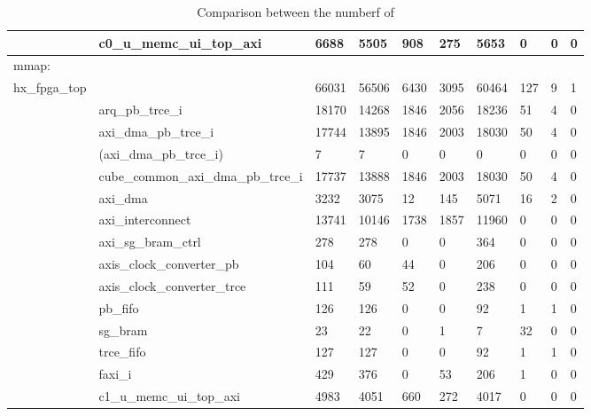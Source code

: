 \begin{table}
\begin{center}
\begin{tabular}{llllllllll}
&    c0\_u\_memc\_ui\_top\_axi                            &       6688 &       5505 &     908 &  275 &  5653 &      0 &      0 &          0 \\
\midrule
mmap: \\
  hx\_fpga\_top                                        & &      66031 &      56506 &    6430 & 3095 & 60464 &    127 &      9 &          1 \\
&   arq\_pb\_trce\_i                                      &      18170 &      14268 &    1846 & 2056 & 18236 &     51 &      4 &          0 \\
&     axi\_dma\_pb\_trce\_i                                &      17744 &      13895 &    1846 & 2003 & 18030 &     50 &      4 &          0 \\
&       (axi\_dma\_pb\_trce\_i)                            &          7 &          7 &       0 &    0 &     0 &      0 &      0 &          0 \\
&       cube\_common\_axi\_dma\_pb\_trce\_i                  &      17737 &      13888 &    1846 & 2003 & 18030 &     50 &      4 &          0 \\
&         axi\_dma                                      &       3232 &       3075 &      12 &  145 &  5071 &     16 &      2 &          0 \\
&         axi\_interconnect                             &      13741 &      10146 &    1738 & 1857 & 11960 &      0 &      0 &          0 \\
&         axi\_sg\_bram\_ctrl                             &        278 &        278 &       0 &    0 &   364 &      0 &      0 &          0 \\
&         axis\_clock\_converter\_pb                      &        104 &         60 &      44 &    0 &   206 &      0 &      0 &          0 \\
&         axis\_clock\_converter\_trce                    &        111 &         59 &      52 &    0 &   238 &      0 &      0 &          0 \\
&         pb\_fifo                                      &        126 &        126 &       0 &    0 &    92 &      1 &      1 &          0 \\
&         sg\_bram                                      &         23 &         22 &       0 &    1 &     7 &     32 &      0 &          0 \\
&         trce\_fifo                                    &        127 &        127 &       0 &    0 &    92 &      1 &      1 &          0 \\
&     faxi\_i                                           &        429 &        376 &       0 &   53 &   206 &      1 &      0 &          0 \\
&       c1\_u\_memc\_ui\_top\_axi                           &       4983 &       4051 &     660 &  272 &  4017 &      0 &      0 &          0 \\


  \bottomrule
\end{tabular}
  \end{center}
\caption{Comparison between the numberf of}\label{tbl:fgpa_comp}
\end{table}


